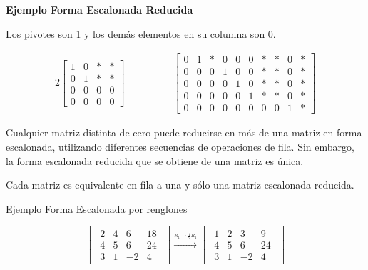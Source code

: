 \documentclass{article}
\begin{document}
\begin{large}
    \textbf{Ejemplo Forma Escalonada Reducida}
\end{large}

Los pivotes son 1 y los demás elementos en su columna son 0.

\begin{alignat*}{2}
    \begin{bmatrix}
        1&0&*&*\\
        0&1&*&*\\
        0&0&0&0\\
        0&0&0&0
    \end{bmatrix}
    & \hspace{ 4em}%
    \begin{bmatrix}
        0&1&*&0&0&0&*&*&0&*\\
        0&0&0&1&0&0&*&*&0&*\\
        0&0&0&0&1&0&*&*&0&*\\
        0&0&0&0&0&1&*&*&0&*\\
        0&0&0&0&0&0&0&0&1&*
    \end{bmatrix}
\end{alignat*}

Cualquier matriz distinta de cero puede reducirse en más de una matriz en forma escalonada, utilizando diferentes secuencias de operaciones de fila. Sin embargo, la forma escalonada reducida que se obtiene de una matriz es única.

\begin{tcolorbox}[colback=green!20!white,colframe=green!80!black,title=Unicidad de la Forma Escalonada Reducida]
    Cada matriz es equivalente en fila a una y sólo una matriz escalonada reducida.
\end{tcolorbox}

\begin{large}
    Ejemplo Forma Escalonada por renglones
\end{large}

\begin{equation*}
    \begin{bmatrix}
        \begin{array}{rrr|r}
            2 & 4 & 6 & 18\\
            4 & 5 & 6 & 24\\
            3 & 1 & -2 & 4
        \end{array}
    \end{bmatrix}
    \xrightarrow{\stackrel{R_1 \rightarrow \frac{1}{2}R_1}{}}
    \begin{bmatrix}
        \begin{array}{rrr|r}
            1 & 2 & 3 & 9\\
            4 & 5 & 6 & 24\\
            3 & 1 & -2 & 4
        \end{array}
    \end{bmatrix}
\end{equation*}
\end{document}

